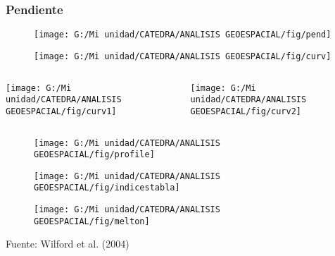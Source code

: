 \documentclass[14pt]{beamer}
\begin{document}
\begin{frame}
\frametitle{Pendiente}
  \begin{figure}
    \centering
    \texttt{[image: G:/Mi unidad/CATEDRA/ANALISIS GEOESPACIAL/fig/pend]}
  \end{figure}
\end{frame}
\begin{frame}
  \begin{figure}
    \centering
    \texttt{[image: G:/Mi unidad/CATEDRA/ANALISIS GEOESPACIAL/fig/curv]}
  \end{figure}
\end{frame}
\begin{frame}
\begin{columns}
		\begin{column}{.50\linewidth}
		 \texttt{[image: G:/Mi unidad/CATEDRA/ANALISIS GEOESPACIAL/fig/curv1]}
		\end{column}
		\begin{column}{.50\linewidth}
			 \texttt{[image: G:/Mi unidad/CATEDRA/ANALISIS GEOESPACIAL/fig/curv2]}
		\end{column}
	\end{columns}
\end{frame}
\begin{frame}
  \begin{figure}
    \centering
    \texttt{[image: G:/Mi unidad/CATEDRA/ANALISIS GEOESPACIAL/fig/profile]}
  \end{figure}
\end{frame}
\begin{frame}
  \begin{figure}
    \centering
    \texttt{[image: G:/Mi unidad/CATEDRA/ANALISIS GEOESPACIAL/fig/indicestabla]}
  \end{figure}
\end{frame}
\begin{frame}
  \begin{figure}
    \centering
    \texttt{[image: G:/Mi unidad/CATEDRA/ANALISIS GEOESPACIAL/fig/melton]}
  \end{figure}
\tiny{Fuente: Wilford et al. (2004)}
\end{frame}
\end{document}
